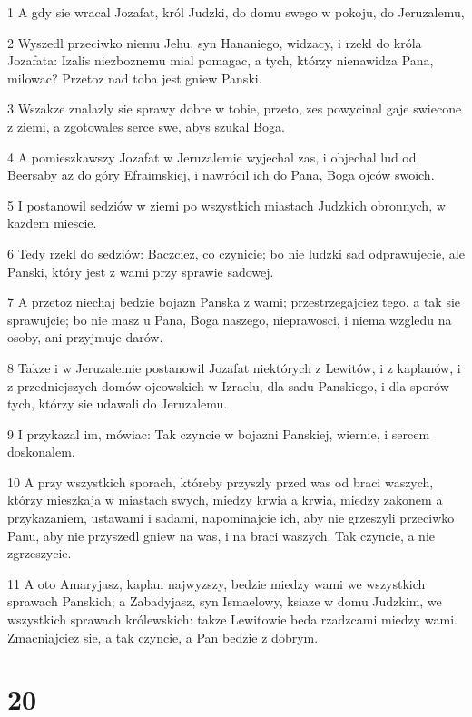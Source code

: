 \par 1 A gdy sie wracal Jozafat, król Judzki, do domu swego w pokoju, do Jeruzalemu,
\par 2 Wyszedl przeciwko niemu Jehu, syn Hananiego, widzacy, i rzekl do króla Jozafata: Izalis niezboznemu mial pomagac, a tych, którzy nienawidza Pana, milowac? Przetoz nad toba jest gniew Panski.
\par 3 Wszakze znalazly sie sprawy dobre w tobie, przeto, zes powycinal gaje swiecone z ziemi, a zgotowales serce swe, abys szukal Boga.
\par 4 A pomieszkawszy Jozafat w Jeruzalemie wyjechal zas, i objechal lud od Beersaby az do góry Efraimskiej, i nawrócil ich do Pana, Boga ojców swoich.
\par 5 I postanowil sedziów w ziemi po wszystkich miastach Judzkich obronnych, w kazdem miescie.
\par 6 Tedy rzekl do sedziów: Baczciez, co czynicie; bo nie ludzki sad odprawujecie, ale Panski, który jest z wami przy sprawie sadowej.
\par 7 A przetoz niechaj bedzie bojazn Panska z wami; przestrzegajciez tego, a tak sie sprawujcie; bo nie masz u Pana, Boga naszego, nieprawosci, i niema wzgledu na osoby, ani przyjmuje darów.
\par 8 Takze i w Jeruzalemie postanowil Jozafat niektórych z Lewitów, i z kaplanów, i z przedniejszych domów ojcowskich w Izraelu, dla sadu Panskiego, i dla sporów tych, którzy sie udawali do Jeruzalemu.
\par 9 I przykazal im, mówiac: Tak czyncie w bojazni Panskiej, wiernie, i sercem doskonalem.
\par 10 A przy wszystkich sporach, któreby przyszly przed was od braci waszych, którzy mieszkaja w miastach swych, miedzy krwia a krwia, miedzy zakonem a przykazaniem, ustawami i sadami, napominajcie ich, aby nie grzeszyli przeciwko Panu, aby nie przyszedl gniew na was, i na braci waszych. Tak czyncie, a nie zgrzeszycie.
\par 11 A oto Amaryjasz, kaplan najwyzszy, bedzie miedzy wami we wszystkich sprawach Panskich; a Zabadyjasz, syn Ismaelowy, ksiaze w domu Judzkim, we wszystkich sprawach królewskich: takze Lewitowie beda rzadzcami miedzy wami. Zmacniajciez sie, a tak czyncie, a Pan bedzie z dobrym.

\chapter{20}

